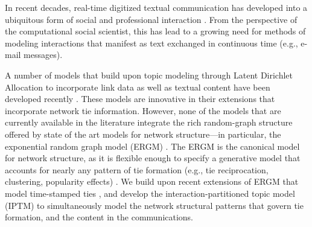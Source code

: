 \documentclass[twoside]{article}
\begin{document}


In recent decades, real-time digitized textual communication has developed into a ubiquitous form of social and professional interaction \citep[see, e.g.,][]{kanungo2008modeling, szostek2011dealing, burgess2004email, pew2016}. From the perspective of the computational social scientist, this has lead to a growing need for methods of modeling interactions that manifest as text exchanged in continuous time (e.g., e-mail messages). 

A number of models that build upon topic modeling through Latent Dirichlet Allocation \citep{Blei2003} to incorporate link data as well as textual content have been developed recently \citep{mccallum2005author,lim2013twitter,Krafft2012}. These models are innovative in their extensions that incorporate network tie information. However, none of the models that are currently available in the literature integrate the rich random-graph structure offered by state of the art models for network structure---in particular, the exponential random graph model (ERGM) \citep{robins2007introduction,chatterjee2013estimating,hunter2008ergm}. The ERGM is the canonical model for network structure, as it is flexible enough to specify a generative model that accounts for nearly any pattern of tie formation (e.g., tie reciprocation, clustering, popularity effects) \citep{desmarais2017statistical}. We build upon recent extensions of ERGM that model time-stamped ties \citep{PerryWolfe2012,Butts2008}, and develop the interaction-partitioned topic model (IPTM) to simultaneously model the network structural patterns that govern tie formation, and the content in the communications.
\end{document}

